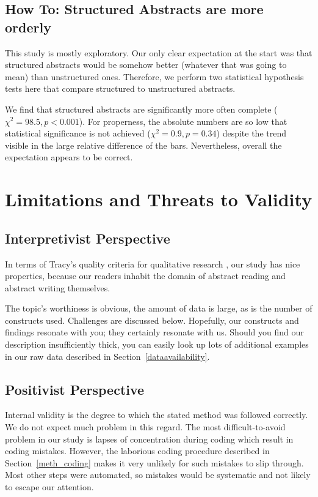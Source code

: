 \documentclass[10pt,journal,compsoc]{IEEEtran}
\begin{document}
\subsection{How To: Structured Abstracts are more orderly}\label{structuredgood}

This study is mostly exploratory.
Our only clear expectation at the start was that structured abstracts would be
somehow better (whatever that was going to mean) than unstructured ones.
Therefore, we perform two statistical hypothesis tests here that compare
structured to unstructured abstracts.

We find that structured abstracts are significantly more often complete ($\chi^2=98.5, p < 0.001$).
For properness, the absolute numbers are so low that statistical significance
is not achieved ($\chi^2=0.9, p=0.34$) despite the trend visible in the
large relative difference of the bars.
Nevertheless, overall the expectation appears to be correct.


\section{Limitations and Threats to Validity}

\subsection{Interpretivist Perspective}

In terms of Tracy's quality criteria for qualitative research \cite{Tracy10},
our study has nice properties, because our readers inhabit
the domain of abstract reading and abstract writing themselves.

The topic's worthiness is obvious, the amount of data is large,
as is the number of constructs used.
Challenges are discussed below.
Hopefully, our constructs and findings resonate with you;
they certainly resonate with us.
Should you find our description insufficiently thick,
you can easily look up lots of additional examples in our raw data
described in Section~\ref{dataavailability}.


\subsection{Positivist Perspective}

Internal validity is the degree to which the stated method
was followed correctly.
We do not expect much problem in this regard.
The most difficult-to-avoid problem in our study is lapses of concentration
during coding which result in coding mistakes.
However, the laborious coding procedure
described in Section~\ref{meth_coding}
makes it very unlikely for such mistakes to slip through.
Most other steps were automated, so mistakes would be systematic
and not likely to escape our attention.
\end{document}
